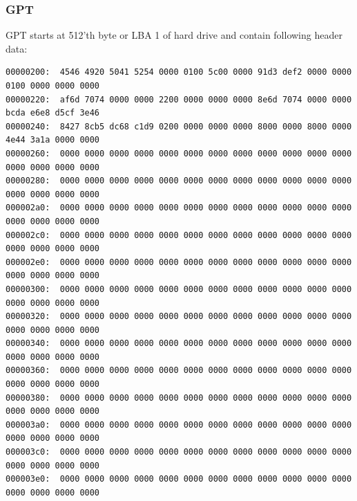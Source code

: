 \documentclass[a4paper,11pt]{article}
\theoremstyle{mytheor}
\begin{document}
\subsubsection{GPT}
    GPT starts at 512'th byte or LBA 1 of hard drive and contain following header data: 

\begin{lstlisting}
00000200:  4546 4920 5041 5254 0000 0100 5c00 0000 91d3 def2 0000 0000 0100 0000 0000 0000
00000220:  af6d 7074 0000 0000 2200 0000 0000 0000 8e6d 7074 0000 0000 bcda e6e8 d5cf 3e46
00000240:  8427 8cb5 dc68 c1d9 0200 0000 0000 0000 8000 0000 8000 0000 4e44 3a1a 0000 0000
00000260:  0000 0000 0000 0000 0000 0000 0000 0000 0000 0000 0000 0000 0000 0000 0000 0000
00000280:  0000 0000 0000 0000 0000 0000 0000 0000 0000 0000 0000 0000 0000 0000 0000 0000
000002a0:  0000 0000 0000 0000 0000 0000 0000 0000 0000 0000 0000 0000 0000 0000 0000 0000
000002c0:  0000 0000 0000 0000 0000 0000 0000 0000 0000 0000 0000 0000 0000 0000 0000 0000
000002e0:  0000 0000 0000 0000 0000 0000 0000 0000 0000 0000 0000 0000 0000 0000 0000 0000
00000300:  0000 0000 0000 0000 0000 0000 0000 0000 0000 0000 0000 0000 0000 0000 0000 0000
00000320:  0000 0000 0000 0000 0000 0000 0000 0000 0000 0000 0000 0000 0000 0000 0000 0000
00000340:  0000 0000 0000 0000 0000 0000 0000 0000 0000 0000 0000 0000 0000 0000 0000 0000
00000360:  0000 0000 0000 0000 0000 0000 0000 0000 0000 0000 0000 0000 0000 0000 0000 0000
00000380:  0000 0000 0000 0000 0000 0000 0000 0000 0000 0000 0000 0000 0000 0000 0000 0000
000003a0:  0000 0000 0000 0000 0000 0000 0000 0000 0000 0000 0000 0000 0000 0000 0000 0000
000003c0:  0000 0000 0000 0000 0000 0000 0000 0000 0000 0000 0000 0000 0000 0000 0000 0000
000003e0:  0000 0000 0000 0000 0000 0000 0000 0000 0000 0000 0000 0000 0000 0000 0000 0000
\end{lstlisting}
\end{document}
